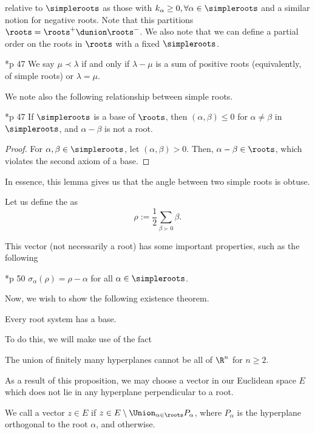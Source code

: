 \documentclass[11pt,leqno,oneside]{amsart}
\numberwithin{thm}{section}
\newcommand{\halfsum}{\rho}
\begin{document}
relative to $\simpleroots$ as those with $k_\alpha \geq 0, \forall \alpha
\in \simpleroots$ and a similar notion for negative roots. Note that this
partitions $\roots = \roots^+ \dunion \roots^-$. We also note that we can
define a partial order on the roots in $\roots$ with a fixed $\simpleroots$.
\begin{defn}\label{partial-order-on-roots}
  \cite{humph}*{p 47} We say $\mu \prec \lambda$ if and only if $\lambda - \mu$ is a sum
  of positive roots (equivalently, of simple roots) or $\lambda =
  \mu$. 
\end{defn}
We note also the following relationship between simple roots.
\begin{lem}\label{a-b-not-a-root}
  \cite{humph}*{p 47} If $\simpleroots$ is a base of $\roots$, then $(\alpha,
  \beta) \leq 0$ for $\alpha \neq \beta$ in $\simpleroots$, and $\alpha -
  \beta$ is not a root.
\end{lem}
\begin{proof}
  For \(\alpha,\beta \in \simpleroots\), let \((\alpha,\beta) >
  0\). Then, \(\alpha-\beta \in \roots\), which violates the second
  axiom of a base. 
\end{proof}
In essence,
this lemma gives us that the angle between two simple roots is obtuse.
\begin{defn}\label{half-sum-defn}
  Let us define the  as \[
    \halfsum := \frac{1}{2}
  \sum_{\beta \succ 0} \beta.
\]
\end{defn}
This vector (not necessarily a root) has some important properties,
such as the following
\begin{prop}
  \cite{humph}*{p 50} $\sigma_\alpha(\halfsum) = \halfsum-\alpha$ for all
  $\alpha \in \simpleroots$.
\end{prop}
Now, we wish to show the following existence theorem.
\begin{thm}
  Every root system has a base.
\end{thm}
To do this, we will make use of the fact
\begin{prop}
  The union of finitely many hyperplanes cannot be all of \(\R^n\) for
  \(n \geq 2\).
\end{prop}
As a result of this proposition, we may choose a vector in our
Euclidean space \(E\) which does not lie in any hyperplane
perpendicular to a root.
\begin{defn}
  We call a vector \(z \in E\)  if \(z \in E \setminus
  \Union_{\alpha \in \roots} P_\alpha\), where \(P_\alpha\) is the
  hyperplane orthogonal to the root \(\alpha\), and  otherwise.
\end{defn}
\end{document}
